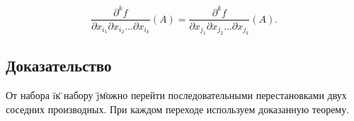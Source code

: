 {\[
\frac{\partial^k f}{\partial x_{i_1} \partial x_{i_2} ... \partial x_{i_k}} (A) = \frac{\partial^k f}{\partial x_{j_1} \partial x_{j_2} ... \partial x_{j_k}} (A).
\]



\subsection*{Доказательство}

От набора \"i\" к набору \"j\" можно перейти последовательными перестановками двух соседних производных. При каждом переходе используем доказанную теорему.


}